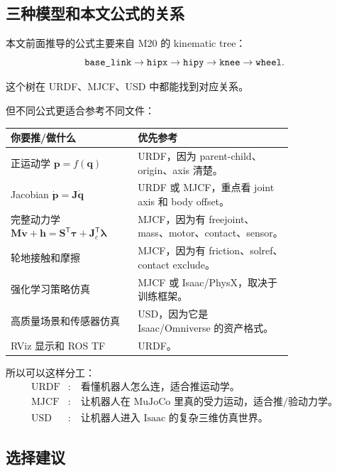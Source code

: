\documentclass[UTF8,11pt,a4paper]{ctexart}
\newcommand{\T}{^{\mathsf T}}
\newcommand{\bs}[1]{\bm{#1}}
\begin{document}
\subsection{三种模型和本文公式的关系}

本文前面推导的公式主要来自 M20 的 kinematic tree：
\[
\text{\texttt{base\_link}}
\rightarrow
\text{\texttt{hipx}}
\rightarrow
\text{\texttt{hipy}}
\rightarrow
\text{\texttt{knee}}
\rightarrow
\text{\texttt{wheel}}.
\]

这个树在 URDF、MJCF、USD 中都能找到对应关系。

但不同公式更适合参考不同文件：

\begin{center}
\begin{tabular}{p{0.34\linewidth}p{0.45\linewidth}}
\toprule
你要推/做什么 & 优先参考 \\
\midrule
正运动学 \(\bs p=f(\bs q)\) & URDF，因为 parent-child、origin、axis 清楚。\\
Jacobian \(\dot{\bs p}=\bs J\dot{\bs q}\) & URDF 或 MJCF，重点看 joint axis 和 body offset。\\
完整动力学 \(\bs M\dot{\bs v}+\bs h=\bs S\T\bs\tau+\bs J_c\T\bs\lambda\) & MJCF，因为有 freejoint、mass、motor、contact、sensor。\\
轮地接触和摩擦 & MJCF，因为有 friction、solref、contact exclude。\\
强化学习策略仿真 & MJCF 或 Isaac/PhysX，取决于训练框架。\\
高质量场景和传感器仿真 & USD，因为它是 Isaac/Omniverse 的资产格式。\\
RViz 显示和 ROS TF & URDF。\\
\bottomrule
\end{tabular}
\end{center}

所以可以这样分工：
\[
\boxed{
\begin{aligned}
\text{URDF} &:\quad \text{看懂机器人怎么连，适合推运动学。}\\
\text{MJCF} &:\quad \text{让机器人在 MuJoCo 里真的受力运动，适合推/验动力学。}\\
\text{USD} &:\quad \text{让机器人进入 Isaac 的复杂三维仿真世界。}
\end{aligned}
}
\]

\subsection{选择建议}
\end{document}

